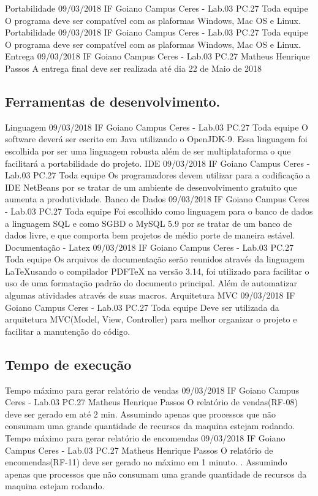     {Portabilidade}
    {09/03/2018}
    {IF Goiano Campus Ceres - Lab.03 PC.27}
    {Toda equipe}
    {O programa deve ser compatível com as plaformas Windows, Mac OS e Linux.}
    {Portabilidade}
    {09/03/2018}
    {IF Goiano Campus Ceres - Lab.03 PC.27}
    {Toda equipe}
    {O programa deve ser compatível com as plaformas Windows, Mac OS e Linux.}
    {Entrega}
    {09/03/2018}
    {IF Goiano Campus Ceres - Lab.03 PC.27}
    {Matheus Henrique Passos}
    {A entrega final deve ser realizada até dia 22 de Maio de 2018}
\subsection{Ferramentas de desenvolvimento.}
    {Linguagem}
    {09/03/2018}
    {IF Goiano Campus Ceres - Lab.03 PC.27}
    {Toda equipe}
    {O software deverá ser escrito em Java utilizando o OpenJDK-9. Essa linguagem foi escolhida por ser uma linguagem robusta além de ser multiplataforma o que facilitará a portabilidade do projeto.}
    {IDE}
    {09/03/2018}
    {IF Goiano Campus Ceres - Lab.03 PC.27}
    {Toda equipe}
    {Os programadores devem utilizar para a codificação a IDE NetBeans por se tratar de um ambiente de desenvolvimento gratuito que aumenta a produtividade.}
    {Banco de Dados}
    {09/03/2018}
    {IF Goiano Campus Ceres - Lab.03 PC.27}
    {Toda equipe}
    {Foi escolhido como linguagem para o banco de dados a linguagem SQL e como SGBD o MySQL 5.9 por se tratar de um banco de dados livre, e que comporta bem projetos de médio porte de maneira estável.}
    {Documentação - Latex}
    {09/03/2018}
    {IF Goiano Campus Ceres - Lab.03 PC.27}
    {Toda equipe}
    {Os arquivos de documentação serão reunidos através da linguagem \LaTeX usando o compilador PDFTeX na versão 3.14, foi utilizado para facilitar o uso de uma formatação padrão do documento principal. Além de automatizar algumas atividades através de suas macros.}
    {Arquitetura MVC}
    {09/03/2018}
    {IF Goiano Campus Ceres - Lab.03 PC.27}
    {Toda equipe}
    {Deve ser utilizada da arquitetura MVC(Model, View, Controller) para melhor organizar o projeto e facilitar a manutenção do código.}
    
\subsection{Tempo de execução}
    {Tempo máximo para gerar relatório de vendas}
    {09/03/2018}
    {IF Goiano Campus Ceres - Lab.03 PC.27}
    {Matheus Henrique Passos}
    {O relatório de vendas(RF-08) deve ser gerado em até 2 min. Assumindo apenas que processos que não consumam uma grande quantidade de recursos da maquina estejam rodando.}
    {Tempo máximo para gerar relatório de encomendas}
    {09/03/2018}
    {IF Goiano Campus Ceres - Lab.03 PC.27}
    {Matheus Henrique Passos}
    {O relatório de encomendas(RF-11) deve ser gerado no máximo em 1 minuto. . Assumindo apenas que processos que não consumam uma grande quantidade de recursos da maquina estejam rodando.}
